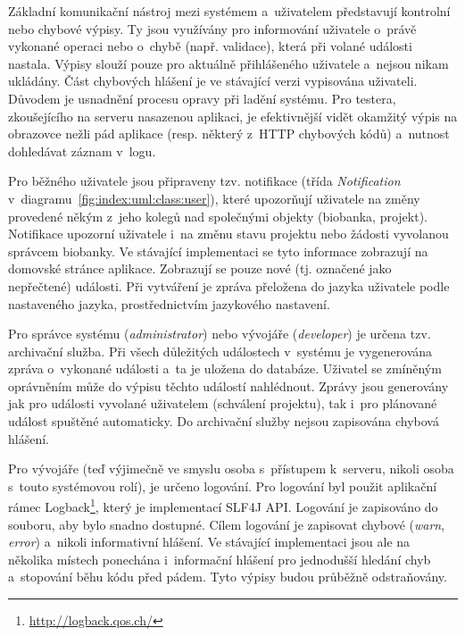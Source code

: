 \documentclass[11pt, final, oneside]{fithesis2}
\begin{document}
Základní komunikační nástroj mezi systémem a~uživatelem představují kontrolní nebo chybové výpisy. Ty jsou využívány pro informování uživatele o~právě vykonané operaci nebo o~chybě (např. validace), která při volané události nastala. Výpisy slouží pouze pro aktuálně přihlášeného uživatele a~nejsou nikam ukládány. Část chybových hlášení je ve stávající verzi vypisována uživateli. Důvodem je usnadnění procesu opravy při ladění systému. Pro testera, zkoušejícího na serveru nasazenou aplikaci, je efektivnější vidět okamžitý výpis na obrazovce nežli pád aplikace (resp. některý z~HTTP chybových kódů) a~nutnost dohledávat záznam v~logu.

Pro běžného uživatele jsou připraveny tzv. notifikace (třída \textit{Notification} v~diagramu~\ref{fig:index:uml:class:user}), které upozorňují uživatele na změny provedené někým z~jeho kolegů nad společnými objekty (biobanka, projekt). Notifikace upozorní uživatele i~na změnu stavu projektu nebo žádosti vyvolanou správcem biobanky. Ve stávající implementaci se tyto informace zobrazují na domovské stránce aplikace. Zobrazují se pouze nové (tj. označené jako nepřečtené) události. Při vytváření je zpráva přeložena do jazyka uživatele podle nastaveného jazyka, prostřednictvím jazykového nastavení.

Pro správce systému (\textit{administrator}) nebo vývojáře (\textit{developer}) je určena tzv. archivační služba. Při všech důležitých událostech v~systému je vygenerována zpráva o~vykonané události a~ta je uložena do databáze. Uživatel se zmíněným oprávněním může do výpisu těchto událostí nahlédnout. Zprávy jsou generovány jak pro události vyvolané uživatelem (schválení projektu), tak i~pro plánované událost spuštěné automaticky. Do archivační služby nejsou zapisována chybová hlášení.

Pro vývojáře (teď výjimečně ve smyslu osoba s~přístupem k~serveru, nikoli osoba s~touto systémovou rolí), je určeno logování. Pro logování byl použit aplikační rámec Logback\footnote{\url{http://logback.qos.ch/}}, který je implementací SLF4J API. Logování je zapisováno do souboru, aby bylo snadno dostupné. Cílem logování je zapisovat chybové (\textit{warn}, \textit{error}) a~nikoli informativní hlášení. Ve stávající implementaci jsou ale na několika místech ponechána i~informační hlášení pro jednodušší hledání chyb a~stopování běhu kódu před pádem. Tyto výpisy budou průběžně odstraňovány.


\end{document}
